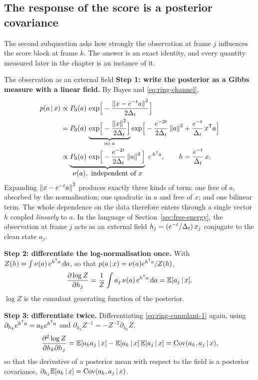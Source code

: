 \subsection{The response of the score is a posterior covariance}
\label{sec:ring-response}

The second subquestion asks how strongly the observation at frame $j$
influences the score block at frame $k$. The answer is an exact identity, and
every quantity measured later in the chapter is an instance of it.

\begin{toolbox}{The observation as an external field}
\textbf{Step 1: write the posterior as a Gibbs measure with a linear field.}
By Bayes and \eqref{eq:ring-channel},
\begin{align*}
  p(a \,|\, x)
  &\propto P_0(a)\, \exp\!\Big[ -\frac{\left\lVert x - e^{-t} a \right\rVert^2}{2\Delta_t} \Big] \\
  &= P_0(a)\,
     \underbrace{\exp\!\Big[-\frac{\left\lVert x \right\rVert^2}{2\Delta_t}\Big]}_{\text{no } a}
     \exp\!\Big[ -\frac{e^{-2t}}{2\Delta_t}\left\lVert a \right\rVert^2
                 + \frac{e^{-t}}{\Delta_t}\, x^{\mathsf{T}} a \Big] \\
  &\propto
     \underbrace{P_0(a)\,
       \exp\!\Big[-\frac{e^{-2t}}{2\Delta_t}\left\lVert a \right\rVert^2\Big]}_{
       \textstyle \nu(a),\ \text{independent of } x}
     \; e^{\, h^{\mathsf{T}} a} ,
  \qquad
  h = \frac{e^{-t}}{\Delta_t}\, x .
\end{align*}
Expanding $\left\lVert x - e^{-t}a \right\rVert^2$ produces exactly three kinds of term: one free
of $a$, absorbed by the normalisation; one quadratic in $a$ and free of $x$;
and one bilinear term. The whole dependence on the data therefore enters
through a single vector $h$ coupled \emph{linearly} to $a$. In the language of
Section~\ref{sec:free-energy}, the observation at frame $j$ acts as an external
field $h_j = (e^{-t}/\Delta_t)\,x_j$ conjugate to the clean state $a_j$.

\textbf{Step 2: differentiate the log-normalisation once.} With
$Z(h) = \int \nu(a)\, e^{h^{\mathsf{T}} a}\,\mathrm{d} a$, so that
$p(a\,|\,x) = \nu(a) e^{h^{\mathsf{T}}a}/Z(h)$,
\begin{equation}
  \frac{\partial \log Z}{\partial h_j}
  = \frac{1}{Z}\int a_j\, \nu(a)\, e^{h^{\mathsf{T}}a}\, \mathrm{d} a
  = \mathbb{E}[a_j \,|\, x] .
  \label{eq:ring-cumulant-1}
\end{equation}
$\log Z$ is the cumulant generating function of the posterior.

\textbf{Step 3: differentiate twice.} Differentiating
\eqref{eq:ring-cumulant-1} again, using
$\partial_{h_k} e^{h^{\mathsf{T}}a} = a_k e^{h^{\mathsf{T}}a}$ and
$\partial_{h_k} Z^{-1} = -Z^{-2}\partial_{h_k} Z$,
\begin{equation}
  \frac{\partial^2 \log Z}{\partial h_k \partial h_j}
  = \mathbb{E}[a_k a_j \,|\, x] - \mathbb{E}[a_k\,|\,x]\,\mathbb{E}[a_j\,|\,x]
  = \mathrm{Cov}(a_k, a_j \,|\, x) ,
  \label{eq:ring-cumulant-2}
\end{equation}
so that the derivative of a posterior mean with respect to the field is a
posterior covariance,
$\partial_{h_j} \mathbb{E}[a_k\,|\,x] = \mathrm{Cov}(a_k, a_j\,|\,x)$.


\end{toolbox}
